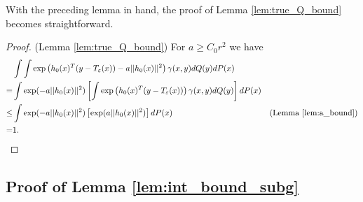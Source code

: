 \documentclass{article}
\theoremstyle{definition}
\newcommand{\Teps}{T_\varepsilon}
\begin{document}
With the preceding lemma in hand, the proof of Lemma \ref{lem:true_Q_bound} becomes straightforward.
\begin{proof} (Lemma \ref{lem:true_Q_bound})
    For $a \geq C_0r^2$ we have
    \begin{align*}
        &\int\int \exp\left (h_0(x)^T(y - \Teps(x)) - a||h_0(x)||^2 \right )\gamma(x,y) dQ(y) dP(x) \\
        =& \int \exp(-a||h_0(x)||^2) \left [ \int \exp\left (h_0(x)^T(y - \Teps(x)) \right )\gamma(x,y) dQ(y) \right ] dP(x) \\
        \leq& \int \exp(-a||h_0(x)||^2) \left [ \exp(a||h_0(x)||^2) \right ] dP(x) & (\text{Lemma \ref{lem:a_bound}}) \\
        =& 1.
    \end{align*}
\end{proof}

\subsection{Proof of Lemma \ref{lem:int_bound_subg}}
\end{document}

